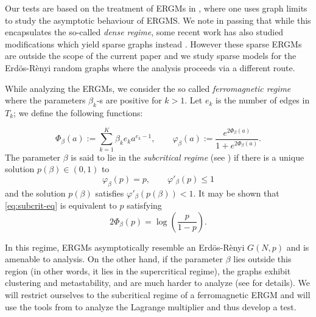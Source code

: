 \documentclass[12pt]{article}
\def\er{ Erd{\"o}s-R{\`e}nyi }
\numberwithin{equation}{section}
\begin{document}
Our tests are based on the treatment of ERGMs in \cite{chatterjee2013estimating}, where one uses graph limits to study the asymptotic behaviour of ERGMS. We note in passing that while this encapsulates the so-called {\it dense regime}, some recent work has also
 studied modifications which yield sparse graphs instead \cite{yin2017asymptotics,mukherjee_sparse,cook2024typical}. However these sparse ERGMs are outside the scope of the current paper and we study sparse models for the \er random graphs where the analysis proceeds via a different route.

 While analyzing the ERGMs, we consider the so called \textit{ferromagnetic regime} where the parameters $\beta_k$-s are positive for $k>1$. Let $e_k$ is the number of edges in $T_k$; we define the following functions:
 
\begin{equation}
\Phi_\beta(a) := \sum_{k=1}^K \beta_ke_k a^{e_k-1}, 
\qquad 
\varphi_\beta(a) := \frac{e^{2\Phi_\beta(a)}}{1+ e^{2\Phi_\beta(a)}}.
\end{equation}
 The parameter $\beta$ is said to lie in the \emph{subcritical regime} (see \cite{bhamidi2011mixing, chatterjee2013estimating}) if there is a unique solution $p(\beta) \in (0,1)$ to
\begin{equation} \label{eq:subcrit-eq}
\varphi_\beta(p) = p, \qquad \varphi'_\beta(p) \leq 1
\end{equation}
and the solution \(p(\beta)\) satisfies \(\varphi'_\beta(p(\beta)) < 1\).
It may be shown that \eqref{eq:subcrit-eq} is equivalent to $p$ satisfying
\begin{equation}
2\Phi_\beta(p) = \log\!\left(\frac{p}{1-p}\right).
\end{equation}

In this regime, ERGMs asymptotically resemble an \er $G(N,p)$ and is amenable to analysis. On the other hand, if the parameter $\beta$ lies outside this region (in other words, it lies in the supercritical regime), the graphs exhibit clustering and metastability, and are much harder to analyze (see \cite{winstein2025concentration,winstein2025quantitative} for details). We will restrict ourselves to the subcritical regime of a ferromagnetic ERGM and will use the tools from \cite{chatterjee2013estimating} to analyze the Lagrange multiplier and thus develop a test.
 
\end{document}
